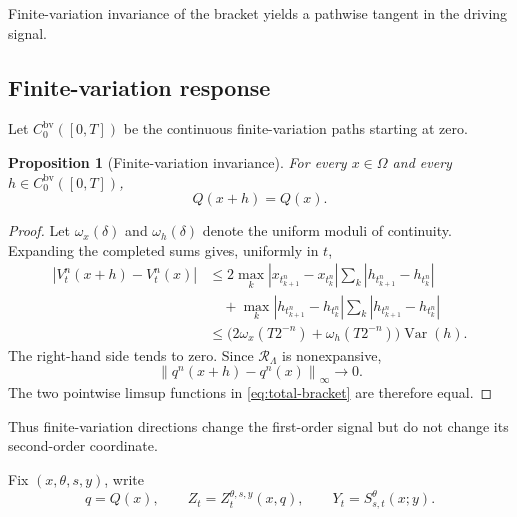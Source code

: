 \documentclass[11pt,reqno]{amsart}
\theoremstyle{plain}
\newtheorem{proposition}[proposition]{Proposition}
\theoremstyle{definition}
\newcommand{\Var}{\operatorname{Var}}
\newcommand{\norm}[1]{\left\lVert #1\right\rVert}
\newcommand{\abs}[1]{\left\lvert #1\right\rvert}
\begin{document}
Finite-variation invariance of the bracket yields a pathwise tangent in the
driving signal.

\subsection{Finite-variation response}

Let \(C_0^{\mathrm{bv}}([0,T])\) be the continuous finite-variation paths
starting at zero.

\begin{proposition}[Finite-variation invariance]\label{prop:bv-invariance}
For every \(x\in\Omega\) and every
\(h\in C_0^{\mathrm{bv}}([0,T])\),
\begin{equation}\label{eq:Q-bv-invariance}
  Q(x+h)=Q(x).
\end{equation}
\end{proposition}

\begin{proof}
Let \(\omega_x(\delta)\) and \(\omega_h(\delta)\) denote the uniform
moduli of continuity.  Expanding the completed sums gives, uniformly in
\(t\),
\begin{align*}
  \abs{V_t^n(x+h)-V_t^n(x)}
  &\le
  2\max_k\abs{x_{t_{k+1}^n}-x_{t_k^n}}
    \sum_k\abs{h_{t_{k+1}^n}-h_{t_k^n}}\\
  &\quad+
  \max_k\abs{h_{t_{k+1}^n}-h_{t_k^n}}
    \sum_k\abs{h_{t_{k+1}^n}-h_{t_k^n}}\\
  &\le
  \bigl(2\omega_x(T2^{-n})+\omega_h(T2^{-n})\bigr)\Var(h).
\end{align*}
The right-hand side tends to zero.  Since
\(\mathcal R_\Lambda\) is nonexpansive,
\[
  \norm{q^n(x+h)-q^n(x)}_\infty\longrightarrow0.
\]
The two pointwise limsup functions in \eqref{eq:total-bracket} are therefore
equal.
\end{proof}

Thus finite-variation directions change the first-order signal but do not
change its second-order coordinate.

Fix \((x,\theta,s,y)\), write
\[
  q=Q(x),
  \qquad
  Z_t=Z_t^{\theta,s,y}(x,q),
  \qquad
  Y_t=S_{s,t}^\theta(x;y).
\]
\end{document}

